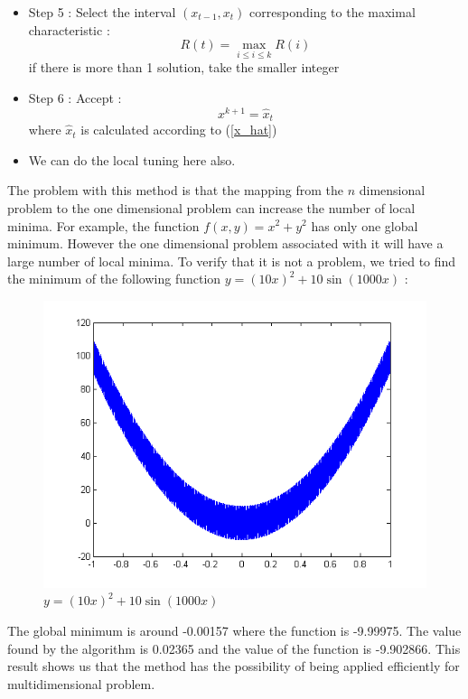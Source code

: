 \begin{itemize}
\begin{itemize}
\begin{equation}
\hat{x}_i=\frac{-z_i+z_{i-1}+z_i'x_i-z_{i-1}'x_{i-1}+0.5m\(x_i^2-x_{i-1}^2\)^2}{m\(x_i-x_{i-1}\)+z_i'-z_{i-1}'} \label{x_hat}
\end{equation}
\item Step 5 : Select the interval $(x_{t-1},x_t)$ corresponding to the maximal characteristic :
\begin{equation}
R(t) = \max_{i\leq i \leq k} R(i)
\end{equation} 
if there is more than 1 solution, take the smaller integer
\item Step 6 : Accept :
\begin{equation}
x^{k+1} = \hat{x}_t
\end{equation}
where $\hat{x}_t$ is calculated according to (\ref{x_hat})
\item We can do the local tuning here also.
\end{itemize}
\end{itemize} 
The problem with this method is that the mapping from the $n$ dimensional
problem to the one dimensional problem can increase the number of local
minima. For example, the function $f(x,y)=x^2+y^2$ has only one global
minimum. However the one dimensional problem associated with it will have a
large number of local minima. To verify that it is not a problem, we tried to
find the minimum of the following function $y=(10x)^2 + 10 \sin(1000x)$ :
\begin{figure}[H]
\centering
\includegraphics[width=0.5\linewidth]{GSA}
\caption{$y=(10x)^2 + 10 \sin(1000x)$}
\end{figure}
\noindent The global minimum is around -0.00157 where the function is -9.99975. The
value found by the algorithm is 0.02365 and the value of the function is
-9.902866. This result shows us that the method has the possibility of being applied
efficiently for multidimensional problem.
